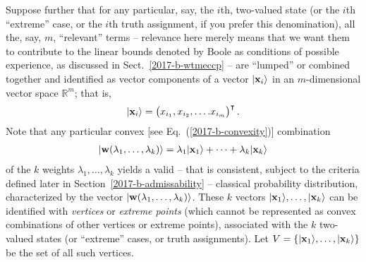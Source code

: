 \documentclass[%
  twocolumn,
 showpacs,
 showkeys,
 preprintnumbers,
 amsmath,amssymb,
 aps,
  pra,
  longbibliography,
 floatfix,
 ]{revtex4-1}
\begin{document}
Suppose further that for any particular, say, the $i$th, two-valued state
(or the $i$th ``extreme'' case, or the $i$th truth assignment, if you prefer this denomination),
all the, say, $m$, ``relevant'' terms
--
relevance here merely means that we want them to contribute to the linear bounds
denoted by Boole as conditions of possible experience, as discussed in Sect.~\ref{2017-b-wtmeccp} -- are ``lumped'' or combined together
and identified as vector components of a vector $\vert {\bf x}_i\rangle $
in an $m$-dimensional vector space $\mathbb{R}^m$; that is,
\begin{equation}
\begin{split}
\vert {\bf x}_i\rangle
=
\begin{pmatrix}
x_{i_1},
x_{i_2},
\ldots .
x_{i_m}
\end{pmatrix}^\intercal
.
\label{2017-b-vivector}
\end{split}
\end{equation}
Note that any particular convex [see Eq.~(\ref{2017-b-convexity})] combination
\begin{equation}
\begin{split}
\vert {\bf w} ( \lambda_1 ,\ldots , \lambda_k ) \rangle
=
\lambda_1 \vert  {\bf x}_1 \rangle  + \cdots + \lambda_k \vert  {\bf x}_k \rangle
\label{2017-b-cow}
\end{split}
\end{equation}
of the $k$ weights $\lambda_1, \ldots ,\lambda_k$
yields a valid -- that is consistent, subject to the criteria defined later in Section~\ref{2017-b-admissability} --
classical probability distribution, characterized by the vector $\vert {\bf w} ( \lambda_1 ,\ldots , \lambda_k ) \rangle  $.
These $k$ vectors
$\vert  {\bf x}_1 \rangle , \ldots , \vert  {\bf x}_k \rangle$
can be identified with
{\em vertices} or {\em extreme points}
(which cannot be represented as convex combinations of other vertices  or   extreme points),
 associated with the $k$ two-valued states  (or ``extreme'' cases, or truth assignments).
Let
$
V
=
\left\{
\vert  {\bf x}_1 \rangle , \ldots , \vert  {\bf x}_k \rangle
\right\}
$
be the set of all such vertices.
\end{document}

